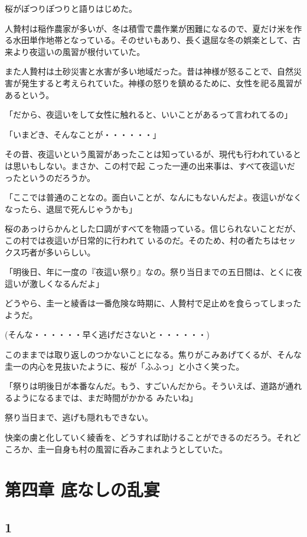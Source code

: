 ﻿\documentclass[book,tate]{jlreq}
\begin{document}
桜がぽつりぽつりと語りはじめた。

人贄村は稲作農家が多いが、冬は積雪で農作業が困難になるので、夏だけ米を作る水田単作地帯となっている。そのせいもあり、長く退屈な冬の娯楽として、古来より夜這いの風習が根付いていた。

また人贄村は土砂災害と水害が多い地域だった。昔は神様が怒ることで、自然災害が発生すると考えられていた。神様の怒りを鎮めるために、女性を祀る風習があるという。

「だから、夜這いをして女性に触れると、いいことがあるって言われてるの」

「いまどき、そんなことが・・・・・・」

その昔、夜這いという風習があったことは知っているが、現代も行われているとは思いもしない。まさか、この村で起 こった一連の出来事は、すべて夜這いだったというのだろうか。

「ここでは普通のことなの。面白いことが、なんにもないんだよ。夜這いがなくなったら、退屈で死んじゃうかも」

桜のあっけらかんとした口調がすべてを物語っている。信じられないことだが、この村では夜這いが日常的に行われて いるのだ。そのため、村の者たちはセックス巧者が多いらしい。

「明後日、年に一度の『夜這い祭り』なの。祭り当日までの五日間は、とくに夜這いが激しくなるんだよ」

どうやら、圭一と綾香は一番危険な時期に、人贄村で足止めを食らってしまったようだ。

(そんな・・・・・・早く逃げださないと・・・・・・)

このままでは取り返しのつかないことになる。焦りがこみあげてくるが、そんな圭一の内心を見抜いたように、桜が「ふふっ」と小さく笑った。

「祭りは明後日が本番なんだ。もう、すごいんだから。そういえば、道路が通れるようになるまでは、まだ時間がかかる みたいね」

祭り当日まで、逃げも隠れもできない。

快楽の虜と化していく綾香を、どうすれば助けることができるのだろう。それどころか、圭一自身も村の風習に呑みこまれようとしていた。

\chapter{第四章 底なしの乱宴}

\section*{1}
\end{document}

